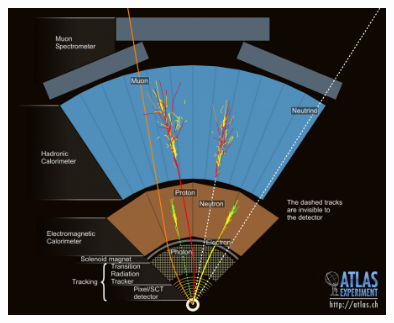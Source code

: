 \documentclass{beamer}
\newcommand*{\header}[1]{\fontsize{16}{8}\selectfont \textbf{{\color{MyPurple}{#1}}}}
\begin{document}
\begin{frame}
\begin{center}
\header{Particles in the Detector}
\end{center}
\begin{center}
\includegraphics[width=0.75\textwidth]{figures/layers}
\end{center}
\end{frame}
\end{document}
